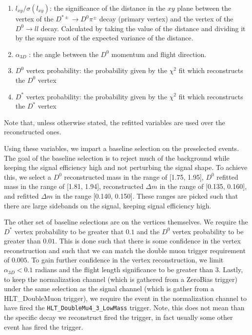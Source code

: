 \begin{enumerate}
    \item $l_{xy}/\sigma\left(l_{xy}\right)$: the significance of the distance in the $xy$ plane between the vertex of the $D^{*\pm} \to D^0 \pi^\pm$ decay (primary vertex) and the vertex of the $D^0 \to l l$ decay. Calculated by taking the value of the distance and dividing it by the square root of the expected variance of the distance. 
    \item $\alpha_{3D}$ : the angle between the $D^0$ momentum and flight direction. 
    \item $D^0$ vertex probability: the probability given by the $\chi^2$ fit which reconstructs the $D^0$ vertex 
    \item $D^*$ vertex probability: the probability given by the $\chi^2$ fit which reconstructs the $D^*$ vertex
\end{enumerate}
Note that, unless otherwise stated, the refitted variables are used over the reconstructed ones. 

Using these variables, we impart a baseline selection on the preselected events. The goal of the baseline selection is to reject much of the background while keeping the signal efficiency high and not perturbing the signal shape. To achieve this, we select a $D^0$ reconstructed mass in the range of [1.75, 1.95], $D^0$ refitted mass in the range of [1.81, 1.94], reconstructed $\Delta m$ in the range of [0.135, 0.160], and refitted $\Delta m$ in the range [0.140, 0.150]. These ranges are picked such that there are large sidebands on the signal, keeping signal efficiency high.

The other set of baseline selections are on the vertices themselves. We require the $D^*$ vertex probability to be greater that $0.1$ and the $D^0$ vertex probability to be greater than $0.01$. This is done such that there is some confidence in the vertex reconstruction and such that we can match the double muon trigger requirement of $0.005$. To gain further confidence in the vertex reconstruction, we limit $\alpha_{3D} < 0.1$ radians and the flight length significance to be greater than 3. Lastly, to keep the normalization channel (which is gathered from a ZeroBias trigger) under the same selection as the signal channel (which is gather from a HLT\_DoubleMuon trigger), we require the event in the normalization channel to have fired the \texttt{HLT\_DoubleMu4\_3\_LowMass} trigger. Note, this does not mean than the specific decay we reconstruct fired the trigger, in fact usually some other event has fired the trigger. 

